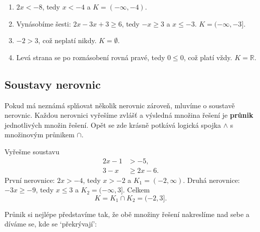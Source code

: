 \begin{solution}
  \begin{enumerate}[label=(\alph*)]
    \item $2x < -8$, tedy $x < -4$ a $K = (-\infty, -4)$.
    \item Vynásobíme šesti: $2x - 3x + 3\geq 6$, tedy $-x\geq 3$ a $x\leq -3$. $K = (-\infty, -3]$.
    \item $-2 > 3$, což neplatí nikdy. $K = \emptyset$.
    \item Levá strana se po roznásobení rovná pravé, tedy $0\leq 0$, což platí vždy. $K = \mathbb{R}$.
  \end{enumerate}
\end{solution}

\subsection{Soustavy nerovnic}

Pokud má neznámá splňovat několik nerovnic zároveň, mluvíme o soustavě nerovnic. Každou nerovnici vyřešíme zvlášť a výsledná množina řešení je \textbf{průnik} jednotlivých množin řešení. Opět se zde krásně potkává logická spojka $\land$ s množinovým průnikem $\cap$.

\begin{example}
  Vyřešme soustavu
  \begin{align*}
    2x - 1 &> -5,\\
    3 - x &\geq 2x - 6.
  \end{align*}
  První nerovnice: $2x > -4$, tedy $x > -2$ a $K_1 = (-2, \infty)$. Druhá nerovnice: $-3x\geq -9$, tedy $x\leq 3$ a $K_2 = (-\infty, 3]$. Celkem
  \begin{equation*}
    K = K_1\cap K_2 = (-2, 3].
  \end{equation*}
\end{example}

Průnik si nejlépe představíme tak, že obě množiny řešení nakreslíme nad sebe a díváme se, kde se `překrývají':
\begin{center}
\end{center}

